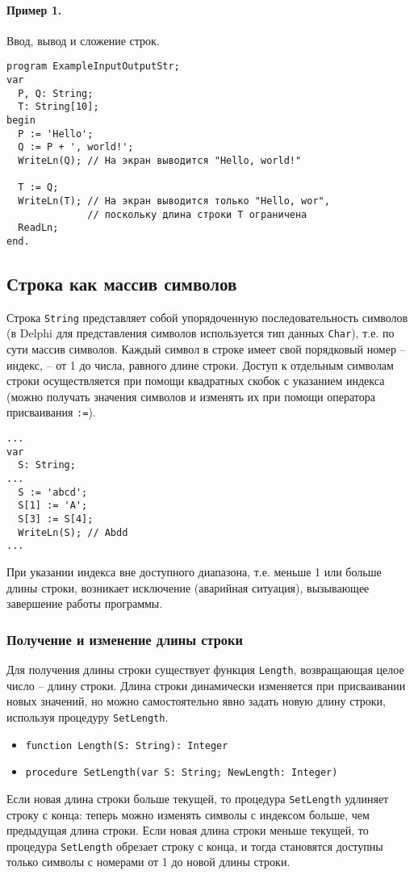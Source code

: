 \documentclass[12pt,a4paper]{report}
\begin{document}
\paragraph*{Пример 1.} Ввод, вывод и сложение строк.
\begin{verbatim}
program ExampleInputOutputStr;
var
  P, Q: String;
  T: String[10];
begin
  P := 'Hello';
  Q := P + ', world!';
  WriteLn(Q); // На экран выводится "Hello, world!"

  T := Q;
  WriteLn(T); // На экран выводится только "Hello, wor",
              // поскольку длина строки T ограничена
  ReadLn;
end.
\end{verbatim}


\subsection*{Строка как массив символов}
Строка \texttt{String} представляет собой упорядоченную последовательность символов (в Delphi для представления символов используется тип данных \texttt{Char}), т.е. по сути массив символов. Каждый символ в строке имеет свой порядковый номер -- индекс, -- от 1 до числа, равного длине строки. Доступ к отдельным символам строки осуществляется при помощи квадратных скобок с указанием индекса (можно получать значения символов и изменять их при помощи оператора присваивания \texttt{:=}).
\begin{verbatim}
...
var
  S: String;
...
  S := 'abcd';
  S[1] := 'A';
  S[3] := S[4];
  WriteLn(S); // Abdd
...
\end{verbatim}
При указании индекса вне доступного диапазона, т.е. меньше 1 или больше длины строки, возникает исключение (аварийная ситуация), вызывающее завершение работы программы.

\subsubsection*{Получение и изменение длины строки}
Для получения длины строки существует функция \texttt{Length}, возвращающая целое число -- длину строки.
Длина строки динамически изменяется при присваивании новых значений, но можно самостоятельно явно задать новую длину строки, используя процедуру \texttt{SetLength}.
\begin{itemize}
\item \texttt{function Length(S: String): Integer}
\item \texttt{procedure SetLength(var S: String; NewLength: Integer)}
\end{itemize}
Если новая длина строки больше текущей, то процедура \texttt{SetLength} удлиняет строку с конца: теперь можно изменять символы с индексом больше, чем предыдущая длина строки.
Если новая длина строки меньше текущей, то процедура \texttt{SetLength} обрезает строку с конца, и тогда становятся доступны только символы с номерами от 1 до новой длины строки.
\end{document}
